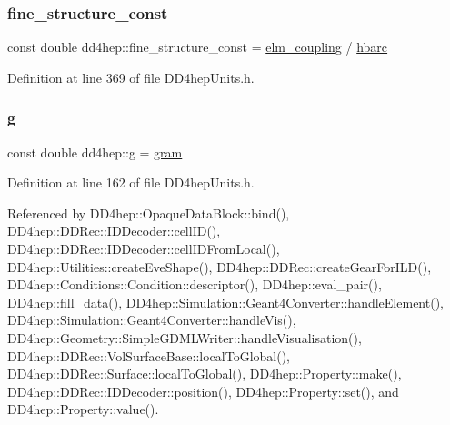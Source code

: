 \subsubsection{\texorpdfstring{fine\+\_\+structure\+\_\+const}{fine\_structure\_const}}
{\footnotesize\ttfamily const double dd4hep\+::fine\+\_\+structure\+\_\+const = \hyperlink{namespacedd4hep_ace30ae02d909a752d5e3f2138bf4ecb1}{elm\+\_\+coupling} / \hyperlink{namespacedd4hep_aee6340c5f86bb7ae1edcc2a90efa056e}{hbarc}\hspace{0.3cm}{\ttfamily [static]}}



Definition at line 369 of file D\+D4hep\+Units.\+h.

\hypertarget{namespacedd4hep_a70d02ec06109b52625ae28861ff25d56}{}\label{namespacedd4hep_a70d02ec06109b52625ae28861ff25d56} 
\subsubsection{\texorpdfstring{g}{g}}
{\footnotesize\ttfamily const double dd4hep\+::g = \hyperlink{namespacedd4hep_ab7942148388bbfa1f47578732153f293}{gram}\hspace{0.3cm}{\ttfamily [static]}}



Definition at line 162 of file D\+D4hep\+Units.\+h.



Referenced by D\+D4hep\+::\+Opaque\+Data\+Block\+::bind(), D\+D4hep\+::\+D\+D\+Rec\+::\+I\+D\+Decoder\+::cell\+I\+D(), D\+D4hep\+::\+D\+D\+Rec\+::\+I\+D\+Decoder\+::cell\+I\+D\+From\+Local(), D\+D4hep\+::\+Utilities\+::create\+Eve\+Shape(), D\+D4hep\+::\+D\+D\+Rec\+::create\+Gear\+For\+I\+L\+D(), D\+D4hep\+::\+Conditions\+::\+Condition\+::descriptor(), D\+D4hep\+::eval\+\_\+pair(), D\+D4hep\+::fill\+\_\+data(), D\+D4hep\+::\+Simulation\+::\+Geant4\+Converter\+::handle\+Element(), D\+D4hep\+::\+Simulation\+::\+Geant4\+Converter\+::handle\+Vis(), D\+D4hep\+::\+Geometry\+::\+Simple\+G\+D\+M\+L\+Writer\+::handle\+Visualisation(), D\+D4hep\+::\+D\+D\+Rec\+::\+Vol\+Surface\+Base\+::local\+To\+Global(), D\+D4hep\+::\+D\+D\+Rec\+::\+Surface\+::local\+To\+Global(), D\+D4hep\+::\+Property\+::make(), D\+D4hep\+::\+D\+D\+Rec\+::\+I\+D\+Decoder\+::position(), D\+D4hep\+::\+Property\+::set(), and D\+D4hep\+::\+Property\+::value().

\hypertarget{namespacedd4hep_ae816701c091bbba2ffee47efd2e88cd8}{}\label{namespacedd4hep_ae816701c091bbba2ffee47efd2e88cd8} 
